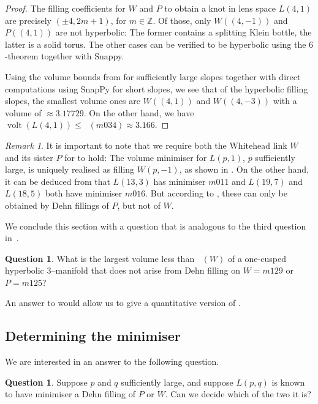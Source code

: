 \documentclass[a4paper]{gtart}
\theoremstyle{definition}
\newtheorem{question}[proposition]{Question}
\theoremstyle{remark}
\newtheorem{remark}[proposition]{Remark}
\numberwithin{equation}{section}
\DeclareMathOperator{\volt}{volt}
\DeclareMathOperator{\volh}{vol_{\mathbb{H}}}
\begin{document}
\begin{proof}
The filling coefficients for $W$ and $P$ to obtain a knot in lens space $L(4,1)$ are precisely $(\pm 4, 2m+1)$, for $m \in \mathbb{Z}$. Of those, only $W((4,-1))$ and $P((4,1))$ are not hyperbolic: The former contains a splitting Klein bottle, the latter is a solid torus. The other cases can be verified to be hyperbolic using the $6$-theorem \cite{agol-bounds,lackenby-6} together with Snappy.

Using the volume bounds from \cite{FuterKalfagianniPurcell} for sufficiently large slopes together with direct computations using SnapPy for short slopes, we see that of the hyperbolic filling slopes, the smallest volume ones are $W((4,1))$ and $W((4,-3))$ with a volume of $\approx 3.17729$.  On the other hand, we have $\volt(L(4,1)) \le \volh(m034) \approx 3.166.$ 
\end{proof}

\begin{remark}
It is important to note that we require both the Whitehead link $W$ and its sister $P$ for  to hold: The volume minimiser for $L(p,1)$, $p$ sufficiently large, is uniquely realised as filling $W(p,-1)$, as shown in . On the other hand, it can be deduced from  that $L(13,3)$ has minimiser $m011$ and $L(19,7)$ and $L(18,5)$ both have minimiser $m016$. But according to , these can only be obtained by Dehn fillings of $P$, but not of $W$. 
\end{remark}

We conclude this section with a question that is analogous to the third question in~\cite[\S 9]{Hodgson_Masai}.
\begin{question}
\label{q:largest}
What is the largest volume less than $\volh(W)$ of a one-cusped hyperbolic 3--manifold that does not arise from Dehn filling on $W=m129$ or $P=m125$? 
\end{question}

An answer to  would allow us to give a quantitative version of .


\subsection{Determining the minimiser}

We are interested in an answer to the following question.

\begin{question}
  \label{q:whichone}
  Suppose $p$ and $q$ sufficiently large, and suppose $L(p,q)$ is known to have minimiser a 
  Dehn filling of $P$ or $W.$ Can we decide which of the two it is? 
\end{question}
\end{document}
